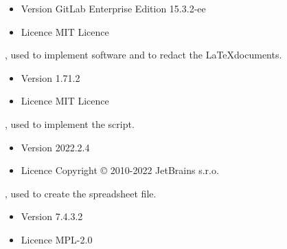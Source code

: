 \begin{itemize}
	\item Version GitLab Enterprise Edition 15.3.2-ee
	\item Licence MIT Licence
\end{itemize}


, used to implement  software and to redact the \LaTeX documents.

\begin{itemize}
	\item Version 1.71.2
	\item Licence MIT Licence
\end{itemize}


, used to implement the  script.

\begin{itemize}
	\item Version 2022.2.4
	\item Licence Copyright © 2010-2022 JetBrains s.r.o.
\end{itemize}


, used to create the spreadsheet file.

\begin{itemize}
	\item Version 7.4.3.2
	\item Licence MPL-2.0
\end{itemize}